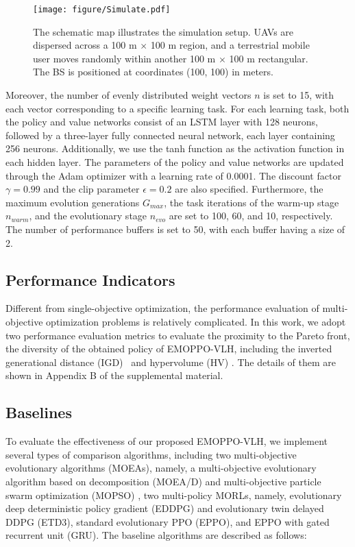 \documentclass[10pt,journal,compsoc]{IEEEtran}
\begin{document}
\begin{figure}[t]
	\centerline{\texttt{[image: figure/Simulate.pdf]}}
	\caption{The schematic map illustrates the simulation setup. UAVs are dispersed across a 100 m $\times$ 100 m region, and a terrestrial mobile user moves randomly within another 100 m $\times$ 100 m rectangular. The BS is positioned at coordinates (100, 100) in meters.}
	\label{fig:simulation}
\end{figure}

\par Moreover, the number of evenly distributed weight vectors $n$ is set to 15, with each vector corresponding to a specific learning task. For each learning task, both the policy and value networks consist of an LSTM layer with 128 neurons, followed by a three-layer fully connected neural network, each layer containing 256 neurons. Additionally, we use the tanh function as the activation function in each hidden layer. The parameters of the policy and value networks are updated through the Adam optimizer with a learning rate of 0.0001. The discount factor $\gamma = 0.99$ and the clip parameter $\epsilon = 0.2$ are also specified. Furthermore, the maximum evolution generations $G_{max}$, the task iterations of the warm-up stage $n_{warm}$, and the evolutionary stage $n_{evo}$ are set to 100, 60, and 10, respectively. The number of performance buffers is set to 50, with each buffer having a size of 2.

\subsection{Performance Indicators}

\par Different from single-objective optimization, the performance evaluation of multi-objective optimization problems is relatively complicated. In this work, we adopt two performance evaluation metrics to evaluate the proximity to the Pareto front, the diversity of the obtained policy of EMOPPO-VLH, including the inverted generational distance (IGD)~\cite{Cai2021AGrid-Based} and hypervolume (HV) \cite{Shang2021ASurvey}. The details of them are shown in Appendix B of the supplemental material.


\subsection{Baselines}

\par To evaluate the effectiveness of our proposed EMOPPO-VLH, we implement several types of comparison algorithms, including two multi-objective evolutionary algorithms (MOEAs), namely, a multi-objective evolutionary algorithm based on decomposition (MOEA/D) \cite{zhang2007moea} and multi-objective particle swarm optimization (MOPSO) \cite{Coello2002MOPSO}, two multi-policy MORLs, namely, evolutionary deep deterministic policy gradient (EDDPG) and evolutionary twin delayed DDPG (ETD3), standard evolutionary PPO (EPPO), and EPPO with gated recurrent unit (GRU). The baseline algorithms are described as follows:
\end{document}
